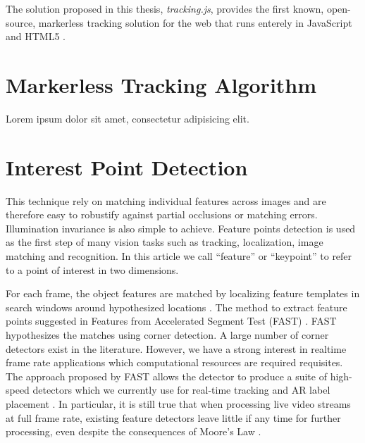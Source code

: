 The solution proposed in this thesis, \textit{tracking.js}, provides the first known, open-source, markerless tracking solution for the web that runs enterely in JavaScript \cite{International2009} and HTML5 \cite{Hickson2013}.


\section{Markerless Tracking Algorithm} %
\label{sec:ar_library_for_the_web:marker_less_tracking_algorithm}

Lorem ipsum dolor sit amet, consectetur adipisicing elit.


\section{Interest Point Detection} %
\label{sec:ar_library_for_the_web:interest_point_detection}

This technique rely on matching individual features across images and are therefore easy to robustify against partial occlusions or matching errors. Illumination invariance is also simple to achieve. Feature points detection is used as the first step of many vision tasks such as tracking, localization, image matching and recognition. In this article we call ``feature'' or ``keypoint'' to refer to a point of interest in two dimensions.

For each frame, the object features are matched by localizing feature templates in search windows around hypothesized locations \cite{Lepetit2005}. The method to extract feature points suggested in Features from Accelerated Segment Test (FAST) \cite{Rosten2010}. FAST \cite{RostenFaster2010} hypothesizes the matches using corner detection. A large number of corner detectors exist in the literature. However, we have a strong interest in realtime frame rate applications which computational resources are required requisites. The approach proposed by FAST \cite{RostenFaster2010} allows the detector to produce a suite of high-speed detectors which we currently use for real-time tracking and AR label placement \cite{Calonder2010}. In particular, it is still true that when processing live video streams at full frame rate, existing feature detectors leave little if any time for further processing, even despite the consequences of Moore’s Law \cite{Rosten2010}.

